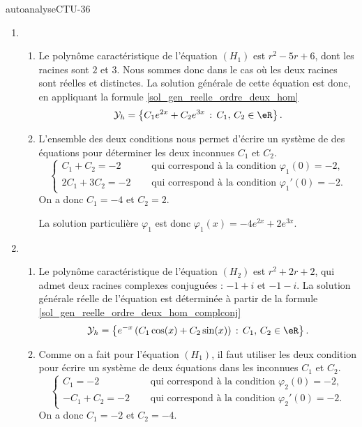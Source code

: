 
\begin{corrige}{autoanalyseCTU-36}

\begin{enumerate}
\item \begin{enumerate}
\item  Le polyn\^ome caractéristique de l'équation $(H_{1})$ est  $r^2-5r+6$, dont les racines sont $2$ et $3$. Nous sommes donc dans le cas où les deux racines sont réelles et distinctes. La solution générale de cette équation est donc, en appliquant la formule \eqref{sol_gen_reelle_ordre_deux_hom}
  \begin{equation*}
  \mathcal{Y}_h  = \left\{C_1 e^{2x} +C_2 e^{3x} \,:\, C_1,\, C_2 \in \eR\right\}.
  \end{equation*}
\item L'ensemble des deux conditions nous permet d'écrire un système de des équations pour déterminer les deux inconnues $C_1$ et $C_2$. 
  \begin{equation*}
    \begin{cases}
      C_1+ C_2 =-2 & \quad\text{ qui correspond à la condition }\varphi_{1}(0)=-2,\\
      2C_1 + 3C_2 = -2 & \quad\text{ qui correspond à la condition }\varphi_{1}'(0)=-2.
    \end{cases}
  \end{equation*}
  On a donc $C_1 = -4$ et $C_2= 2$.

 La solution particulière $\varphi_{1}$ est donc $\varphi_{1}(x)= -4e^{2x} +2 e^{3x}$.
\end{enumerate}
\item \begin{enumerate}
\item   Le polyn\^ome caractéristique de l'équation $(H_{2})$ est  $r^2+2r+2$, qui admet deux racines complexes conjuguées : $-1 +i $ et $-1 -i $. La solution générale réelle de l'équation est déterminée à partir de la formule \eqref{sol_gen_reelle_ordre_deux_hom_complconj}
  \begin{equation}\label{exoautoanal36part2}
    \mathcal{Y}_h  = \left\{ e^{-x}\left(C_1\cos(x) +C_2\sin(x)\right)  \,:\, C_1,\, C_2 \in \eR \right\}.
  \end{equation} 
\item Comme on a fait pour l'équation $(H_{1})$, il faut utiliser les deux condition pour écrire un système de deux équations dans les inconnues $C_1$ et $C_2$.
  \begin{equation*}
    \begin{cases}
      C_1=-2 & \quad\text{ qui correspond à la condition }\varphi_{2}(0)=-2,\\
      -C_1 + C_2 = -2 & \quad\text{ qui correspond à la condition }\varphi_{2}'(0)=-2.
    \end{cases}
  \end{equation*}
  On a donc $C_1 = -2$ et $C_2= -4$.  


\end{enumerate}
\end{enumerate}
\end{corrige}
